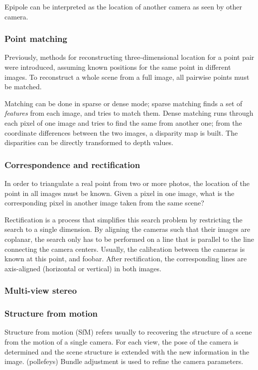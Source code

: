 Epipole can be interpreted as the location of another camera as seen by other camera.

\subsubsection{Point matching}

Previously, methods for reconstructing three-dimensional location for a point pair were introduced, assuming known positions for the same point in different images.
To reconstruct a whole scene from a full image, all pairwise points must be matched.

Matching can be done in sparse or dense mode; sparse matching finds a set of \textit{features} from each image, and tries to match them. Dense matching runs through each pixel of one image and tries to find the same from another one; from the coordinate differences between the two images, a disparity map is built. The disparities can be directly transformed to depth values.


\subsubsection{Correspondence and rectification}

In order to triangulate a real point from two or more photos, the location of the point in all images must be known.
Given a pixel in one image, what is the corresponding pixel in another image taken from the same scene?

Rectification is a process that simplifies this search problem by restricting the search to a single dimension.
By aligning the cameras such that their images are coplanar, the search only has to be performed on a line that is parallel to the line connecting the camera centers.
Usually, the calibration between the cameras is known at this point, and foobar.
After rectification, the corresponding lines are axis-aligned (horizontal or vertical) in both images.


\subsubsection{Multi-view stereo}

\subsubsection{Structure from motion}

Structure from motion (SfM) refers usually to recovering the structure of a scene from the motion of a single camera.
For each view, the pose of the camera is determined and the scene structure is extended with the new information in the image.
(pollefeys)
Bundle adjustment is used to refine the camera parameters.


